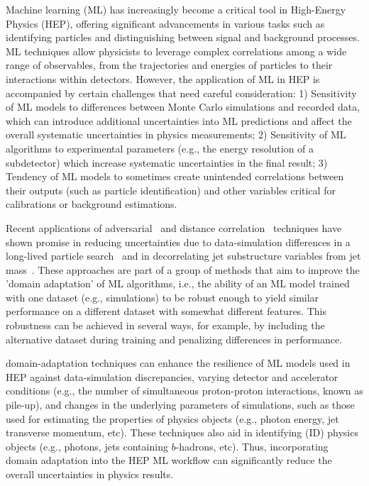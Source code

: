 \documentclass[letter, USenglish, 11pt, subfigure]{article}
\begin{document}
Machine learning (ML) has increasingly become a critical tool in High-Energy Physics (HEP), offering significant advancements in various tasks such as identifying particles and distinguishing between signal and background processes. ML techniques allow physicists to leverage complex correlations among a wide range of observables, from the trajectories and energies of particles to their interactions within detectors. However, the application of ML in HEP is accompanied by certain challenges that need careful consideration: 1) Sensitivity of ML models to differences between Monte Carlo simulations and recorded data, which can introduce additional uncertainties into ML predictions and affect the overall systematic uncertainties in physics measurements; 2) Sensitivity of ML algorithms to experimental parameters (e.g., the energy resolution of a subdetector) which increase systematic uncertainties in the final result; 3) Tendency of ML models to sometimes create unintended correlations between their outputs (such as particle identification) and other variables critical for calibrations or background estimations.

Recent applications of adversarial~\cite{louppe2017learning} and distance correlation~\cite{PhysRevLett.125.122001} techniques have shown promise in reducing uncertainties due to data-simulation differences in a long-lived particle search~\cite{calRatio} and in decorrelating jet substructure variables from jet mass~\cite{ATL-PHYS-PUB-2018-014}. These approaches are part of a group of methods that aim to improve the 'domain adaptation' of ML algorithms, i.e., the ability of an ML model trained with one dataset (e.g., simulations) to be robust enough to yield similar performance on a different dataset with somewhat different features. This robustness can be achieved in several ways, for example, by including the alternative dataset during training and penalizing differences in performance.

domain-adaptation techniques can enhance the resilience of ML models used in HEP against data-simulation discrepancies, varying detector and accelerator conditions (e.g., the number of simultaneous proton-proton interactions, known as pile-up), and changes in the underlying parameters of simulations, such as those used for estimating the properties of physics objects (e.g., photon energy, jet transverse momentum, etc). These techniques also aid in identifying (ID) physics objects (e.g., photons, jets containing $b$-hadrons, etc). Thus, incorporating domain adaptation into the HEP ML workflow can significantly reduce the overall uncertainties in physics results.
\end{document}
